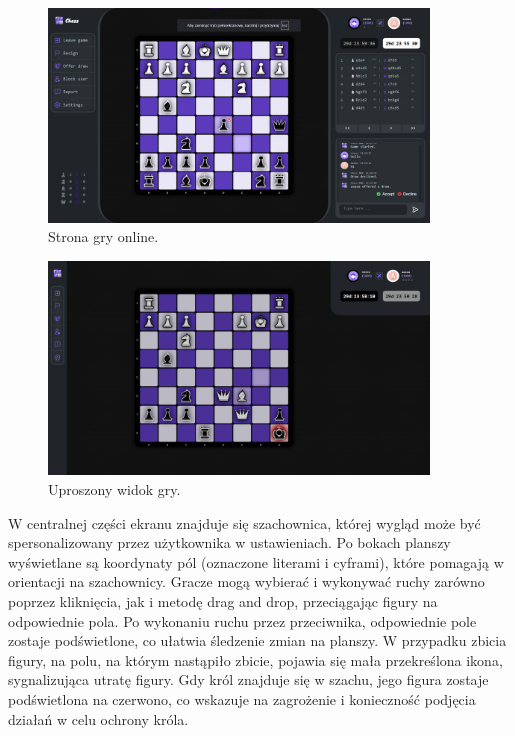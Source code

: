 \documentclass[12pt,a4paper]{article}
\begin{document}
\begin{figure}[h!]
    \centering
    \includegraphics[width=0.9\textwidth]{zdj/ins_webgame.png}
    \caption{Strona gry online.}
\end{figure}

\begin{figure}[h!]
    \centering
    \includegraphics[width=0.9\textwidth]{zdj/ins_simpgame.png}
    \caption{Uproszony widok gry.}
\end{figure}

\newpage

W centralnej części ekranu znajduje się szachownica, której wygląd może być spersonalizowany przez użytkownika w ustawieniach. Po bokach planszy wyświetlane są koordynaty pól (oznaczone literami i cyframi), które pomagają w orientacji na szachownicy. Gracze mogą wybierać i wykonywać ruchy zarówno poprzez kliknięcia, jak i metodę drag and drop, przeciągając figury na odpowiednie pola. Po wykonaniu ruchu przez przeciwnika, odpowiednie pole zostaje podświetlone, co ułatwia śledzenie zmian na planszy. W przypadku zbicia figury, na polu, na którym nastąpiło zbicie, pojawia się mała przekreślona ikona, sygnalizująca utratę figury. Gdy król znajduje się w szachu, jego figura zostaje podświetlona na czerwono, co wskazuje na zagrożenie i konieczność podjęcia działań w celu ochrony króla.
\end{document}
